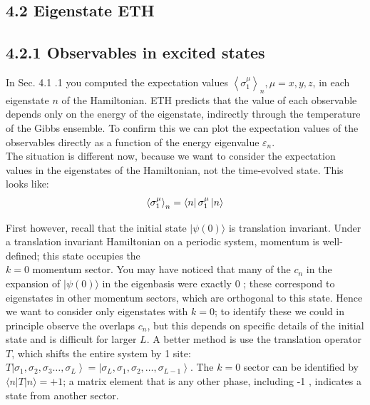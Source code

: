 \documentclass[12pt]{article}
\begin{document}
\subsection*{4.2 Eigenstate ETH}
\subsection*{4.2.1 Observables in excited states}
In Sec. 4.1 .1 you computed the expectation values $\left\langle\sigma_{1}^{\mu}\right\rangle_{n}, \mu=x, y, z$, in each eigenstate $n$ of the Hamiltonian. ETH predicts that the value of each observable depends only on the energy of the eigenstate, indirectly through the temperature of the Gibbs ensemble. To confirm this we can plot the expectation values of the observables directly as a function of the energy eigenvalue $\varepsilon_{n}$.\\
The situation is different now, because we want to consider the expectation values in the eigenstates of the Hamiltonian, not the time-evolved state.
This looks like:
\begin{equation}
\left\langle\sigma_{1}^{\mu}\right\rangle_{n}=\bra{n}\sigma_{1}^{\mu}\ket{n}
\end{equation}

First however, recall that the initial state $|\psi(0)\rangle$ is translation invariant. Under a translation invariant Hamiltonian on a periodic system, momentum is well-defined; this state occupies the\\
$k=0$ momentum sector. You may have noticed that many of the $c_{n}$ in the expansion of $|\psi(0)\rangle$ in the eigenbasis were exactly 0 ; these correspond to eigenstates in other momentum sectors, which are orthogonal to this state. Hence we want to consider only eigenstates with $k=0$; to identify these we could in principle observe the overlaps $c_{n}$, but this depends on specific details of the initial state and is difficult for larger $L$. A better method is use the translation operator $T$, which shifts the entire system by 1 site: $T\left|\sigma_{1}, \sigma_{2}, \sigma_{3} \ldots, \sigma_{L}\right\rangle=\left|\sigma_{L}, \sigma_{1}, \sigma_{2}, \ldots, \sigma_{L-1}\right\rangle$. The $k=0$ sector can be identified by $\langle n|T| n\rangle=+1$; a matrix element that is any other phase, including -1 , indicates a state from another sector.
\end{document}
